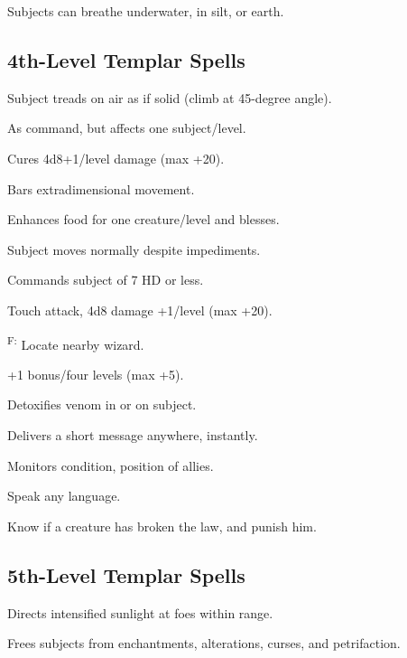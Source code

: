  Subjects can breathe underwater, in silt, or earth.



\subsection{4th-Level Templar Spells}

 Subject treads on air as if solid (climb at 45-degree angle).

 As command, but affects one subject/level.

 Cures 4d8+1/level damage (max +20).

 Bars extradimensional movement.

 Enhances food for one creature/level and blesses.

 Subject moves normally despite impediments.

 Commands subject of 7 HD or less.

 Touch attack, 4d8 damage +1/level (max +20).

\textsuperscript{F:} Locate nearby wizard.

 +1 bonus/four levels (max +5).

 Detoxifies venom in or on subject.

 Delivers a short message anywhere, instantly.

 Monitors condition, position of allies.

 Speak any language.

 Know if a creature has broken the law, and punish him.



\subsection{5th-Level Templar Spells}

 Directs intensified sunlight at foes within range.

 Frees subjects from enchantments, alterations, curses, and petrifaction.

